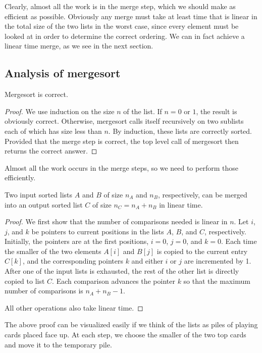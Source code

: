 Clearly, almost all the work is in the merge step, which we should make
as efficient as possible. Obviously any merge must take at least 
time that is linear in the total size of the two lists in the worst case, 
since every element must be looked at in order to determine the correct ordering.  
We can in fact achieve a linear time merge, as we see in the next section. 

\subsection*{Analysis of mergesort}

\begin{Lemma} Mergesort is correct.
\end{Lemma}
\begin{proof}
We use induction on the size $n$ of the list. If $n = 0$ or $1$, the result is 
obviously correct. Otherwise, mergesort calls itself recursively on two sublists
each of which has size less than $n$. By induction, these lists are correctly 
sorted. Provided that the merge step is correct, the top level call of 
mergesort then returns the correct answer. 
\end{proof}

Almost all the work occurs in the merge steps, so we need to perform those 
efficiently.

\begin{Theorem}
Two input sorted lists $A$ and $B$ of size $n_A$ and $n_B$, respectively, 
can be merged into an output sorted list $C$ of size $n_C = n_A + n_B$ in 
linear time.
\end{Theorem}

\begin{proof}
We first show that the number of comparisons needed is linear in $n$.
Let $i$, $j$, and $k$ be pointers to current positions in the lists
${A}$, ${B}$, and ${C}$, respectively. Initially,
the pointers are at the first positions, $i=0$, $j=0$, and $k=0$. Each
time the smaller of the two elements $A[i]$ and $B[j]$ is copied to
the current entry $C[k]$, and the corresponding pointers $k$ and either
$i$ or $j$ are incremented by 1. After one of the input lists is
exhausted, the rest of the other list is directly copied to
list ${C}$. Each comparison advances the pointer $k$ so that the
maximum number of comparisons is $n_A + n_B - 1$. 

All other operations also take linear time.
\end{proof}

The above proof can be visualized easily if we think of the lists as piles of 
playing cards placed face up. At each step, we choose the smaller of the two top
cards and move it to the temporary pile.


